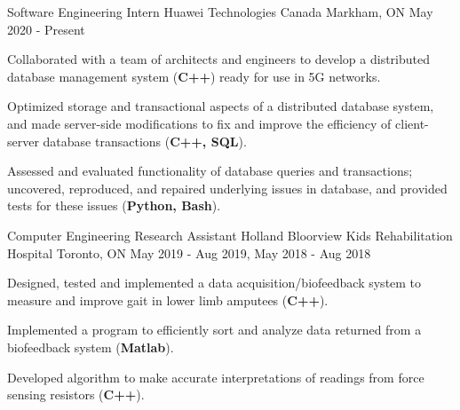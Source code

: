 

\begin{cventries}

  \cventry
    {Software Engineering Intern} %
    {Huawei Technologies Canada} %
    {Markham, ON} %
    {May 2020 - Present} %
    {
      \begin{cvitems} %
        \item {Collaborated with a team of architects and engineers to develop a distributed database management system (\textbf{C++}) ready for use in 5G networks.}
        \item {Optimized storage and transactional aspects of a distributed database system, and made server-side modifications to fix and improve the efficiency of client-server database transactions (\textbf{C++, SQL}).}
        \item {Assessed and evaluated functionality of database queries and transactions; uncovered, reproduced, and repaired underlying issues in database, and provided tests for these issues (\textbf{Python, Bash}).}
      \end{cvitems}
    }

  \cventry
    {Computer Engineering Research Assistant} %
    {Holland Bloorview Kids Rehabilitation Hospital} %
    {Toronto, ON} %
    {May 2019 - Aug 2019, May 2018 - Aug 2018} %
    {
      \begin{cvitems} %
        \item {Designed, tested and implemented a data acquisition/biofeedback system to measure and improve gait in lower limb amputees (\textbf{C++}).}
        \item {Implemented a program to efficiently sort and analyze data returned from a biofeedback system (\textbf{Matlab}).}
        \item {Developed algorithm to make accurate interpretations of readings from force sensing resistors (\textbf{C++}).}
      \end{cvitems}
    }
    
\end{cventries}
